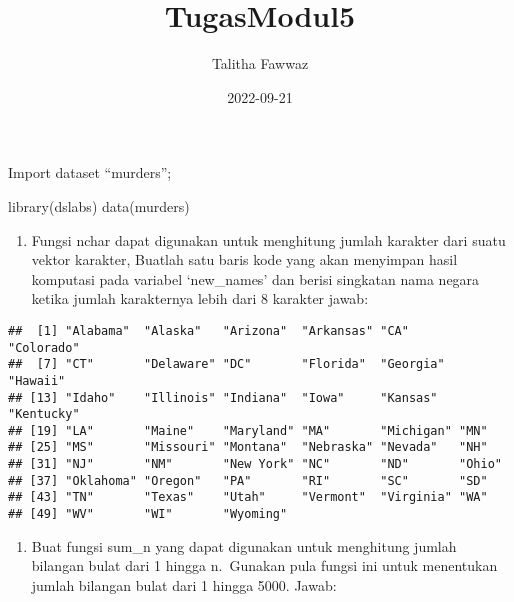 \documentclass[
]{article}
\title{TugasModul5}
\author{Talitha Fawwaz}
\date{2022-09-21}
\newenvironment{Shaded}{\begin{snugshade}}{\end{snugshade}}
\newcommand{\DecValTok}[1]{\textcolor[rgb]{0.00,0.00,0.81}{#1}}
\newcommand{\FunctionTok}[1]{\textcolor[rgb]{0.00,0.00,0.00}{#1}}
\newcommand{\NormalTok}[1]{#1}
\newcommand{\OtherTok}[1]{\textcolor[rgb]{0.56,0.35,0.01}{#1}}
\newcommand{\SpecialCharTok}[1]{\textcolor[rgb]{0.00,0.00,0.00}{#1}}
\providecommand{\tightlist}{%
  \setlength{\itemsep}{0pt}\setlength{\parskip}{0pt}}
\begin{document}
\maketitle

Import dataset ``murders'';

\begin{Shaded}
\begin{Highlighting}[]
\FunctionTok{library}\NormalTok{(dslabs)}
\FunctionTok{data}\NormalTok{(murders)}
\end{Highlighting}
\end{Shaded}

\begin{enumerate}
\def\labelenumi{\arabic{enumi}.}
\tightlist
\item
  Fungsi nchar dapat digunakan untuk menghitung jumlah karakter dari
  suatu vektor karakter, Buatlah satu baris kode yang akan menyimpan
  hasil komputasi pada variabel `new\_names' dan berisi singkatan nama
  negara ketika jumlah karakternya lebih dari 8 karakter jawab:
\end{enumerate}

\begin{Shaded}
\end{Shaded}

\begin{verbatim}
##  [1] "Alabama"  "Alaska"   "Arizona"  "Arkansas" "CA"       "Colorado"
##  [7] "CT"       "Delaware" "DC"       "Florida"  "Georgia"  "Hawaii"  
## [13] "Idaho"    "Illinois" "Indiana"  "Iowa"     "Kansas"   "Kentucky"
## [19] "LA"       "Maine"    "Maryland" "MA"       "Michigan" "MN"      
## [25] "MS"       "Missouri" "Montana"  "Nebraska" "Nevada"   "NH"      
## [31] "NJ"       "NM"       "New York" "NC"       "ND"       "Ohio"    
## [37] "Oklahoma" "Oregon"   "PA"       "RI"       "SC"       "SD"      
## [43] "TN"       "Texas"    "Utah"     "Vermont"  "Virginia" "WA"      
## [49] "WV"       "WI"       "Wyoming"
\end{verbatim}

\begin{enumerate}
\def\labelenumi{\arabic{enumi}.}
\setcounter{enumi}{1}
\tightlist
\item
  Buat fungsi sum\_n yang dapat digunakan untuk menghitung jumlah
  bilangan bulat dari 1 hingga n.~Gunakan pula fungsi ini untuk
  menentukan jumlah bilangan bulat dari 1 hingga 5000. Jawab:
\end{enumerate}
\end{document}
